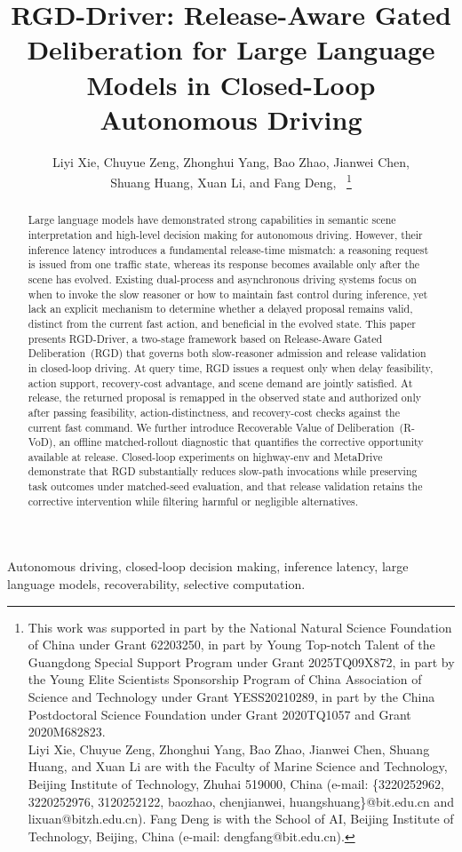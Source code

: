 \documentclass[letterpaper,journal]{IEEEtran}
\title{RGD-Driver: Release-Aware Gated Deliberation for Large Language Models in Closed-Loop Autonomous Driving}
\author{Liyi Xie, Chuyue Zeng, Zhonghui Yang, Bao Zhao, Jianwei Chen,\\
Shuang Huang, Xuan Li, and Fang Deng,~\IEEEmembership{Fellow,~IEEE}%
\thanks{This work was supported in part by the National Natural Science Foundation of
China under Grant 62203250, in part by Young Top-notch Talent of the Guangdong
Special Support Program under Grant 2025TQ09X872, in part by the Young Elite
Scientists Sponsorship Program of China Association of Science and Technology
under Grant YESS20210289, in part by the China Postdoctoral Science
Foundation under Grant 2020TQ1057 and Grant 2020M682823.
\protect\\
\hspace*{1em}Liyi Xie, Chuyue Zeng, Zhonghui Yang, Bao Zhao, Jianwei Chen,
Shuang Huang, and Xuan Li are with the Faculty of Marine Science and
Technology, Beijing Institute of Technology, Zhuhai 519000, China
(e-mail: \{3220252962, 3220252976, 3120252122, baozhao, chenjianwei,
huangshuang\}@bit.edu.cn and lixuan@bitzh.edu.cn).
Fang Deng is with the School of AI, Beijing Institute of Technology,
Beijing, China (e-mail: dengfang@bit.edu.cn).}}
\begin{document}
\maketitle
{}

\begin{abstract}
Large language models have demonstrated strong capabilities in semantic scene interpretation and high-level decision making for autonomous driving. However, their inference latency introduces a fundamental release-time mismatch: a reasoning request is issued from one traffic state, whereas its response becomes available only after the scene has evolved. Existing dual-process and asynchronous driving systems focus on when to invoke the slow reasoner or how to maintain fast control during inference, yet lack an explicit mechanism to determine whether a delayed proposal remains valid, distinct from the current fast action, and beneficial in the evolved state. This paper presents RGD-Driver, a two-stage framework based on Release-Aware Gated Deliberation~(RGD) that governs both slow-reasoner admission and release validation in closed-loop driving. At query time, RGD issues a request only when delay feasibility, action support, recovery-cost advantage, and scene demand are jointly satisfied. At release, the returned proposal is remapped in the observed state and authorized only after passing feasibility, action-distinctness, and recovery-cost checks against the current fast command. We further introduce Recoverable Value of Deliberation~(R-VoD), an offline matched-rollout diagnostic that quantifies the corrective opportunity available at release. Closed-loop experiments on highway-env and MetaDrive demonstrate that RGD substantially reduces slow-path invocations while preserving task outcomes under matched-seed evaluation, and that release validation retains the corrective intervention while filtering harmful or negligible alternatives.
\end{abstract}

\begin{IEEEkeywords}
Autonomous driving, closed-loop decision making, inference latency,
large language models, recoverability, selective computation.
\end{IEEEkeywords}
\end{document}
